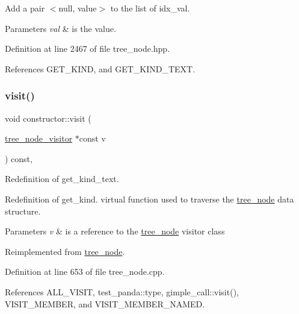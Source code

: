 Add a pair $<$null, value$>$ to the list of idx\+\_\+val. 


\begin{DoxyParams}{Parameters}
{\em val} & is the value. \\
\hline
\end{DoxyParams}


Definition at line 2467 of file tree\+\_\+node.\+hpp.



References G\+E\+T\+\_\+\+K\+I\+ND, and G\+E\+T\+\_\+\+K\+I\+N\+D\+\_\+\+T\+E\+XT.

\mbox{\label{structconstructor_ab925f188b5f5eb45088c8c72ea11055e}} 
\subsubsection{\texorpdfstring{visit()}{visit()}}
{\footnotesize\ttfamily void constructor\+::visit (\begin{DoxyParamCaption}\item[{\hyperlink{classtree__node__visitor}{tree\+\_\+node\+\_\+visitor} $\ast$const}]{v }\end{DoxyParamCaption}) const\hspace{0.3cm}{\ttfamily [override]}, {\ttfamily [virtual]}}



Redefinition of get\+\_\+kind\+\_\+text. 

Redefinition of get\+\_\+kind. virtual function used to traverse the \hyperlink{classtree__node}{tree\+\_\+node} data structure. 
\begin{DoxyParams}{Parameters}
{\em v} & is a reference to the \hyperlink{classtree__node}{tree\+\_\+node} visitor class \\
\hline
\end{DoxyParams}


Reimplemented from \hyperlink{classtree__node_aa9abba3f1b30e0be80b4a56b188c6ecc}{tree\+\_\+node}.



Definition at line 653 of file tree\+\_\+node.\+cpp.



References A\+L\+L\+\_\+\+V\+I\+S\+IT, test\+\_\+panda\+::type, gimple\+\_\+call\+::visit(), V\+I\+S\+I\+T\+\_\+\+M\+E\+M\+B\+ER, and V\+I\+S\+I\+T\+\_\+\+M\+E\+M\+B\+E\+R\+\_\+\+N\+A\+M\+ED.

